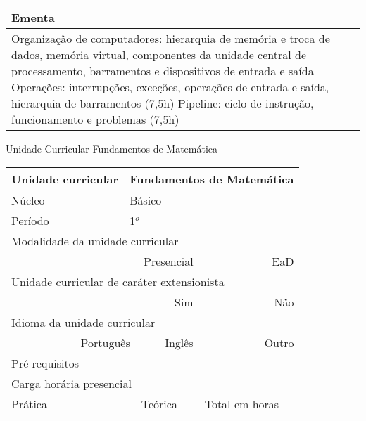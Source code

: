 \begin{quadro}[ht!]
\begin{tabular}{|p{3cm} p{2cm} p{3cm} p{2cm} p{3cm} p{2cm}|}
\multicolumn{6}{|p{15cm}|}{\cellcolor{blue1} Ementa} \\\hline
\hline\multicolumn{6}{|p{15cm}|}{\scriptsize Organização de computadores: hierarquia de memória e troca de dados, memória virtual, componentes da unidade central de processamento, barramentos e dispositivos de entrada e saída Operações: interrupções, exceções, operações de entrada e saída, hierarquia de barramentos (7,5h) Pipeline: ciclo de instrução, funcionamento e problemas (7,5h)}\\\hline
\hline
	\end{tabular}
\end{quadro}
\begin{quadro}[ht!]
  \centering\scriptsize
\caption{Unidade Curricular Fundamentos de Matemática}
\label{ unit_3 }
\begin{tabular}{|p{3cm} p{2cm} p{3cm} p{2cm} p{3cm} p{2cm}|}\hline
\multicolumn{1}{|p{3cm}|}{\cellcolor{blue1} Unidade curricular} & \multicolumn{5}{p{9cm}|}{ Fundamentos de Matemática }\\\hline
\multicolumn{1}{|p{3cm}|}{\cellcolor{blue1} Núcleo} & \multicolumn{5}{p{11.5cm}|}{ Básico }\\\hline
\multicolumn{1}{|p{3cm}|}{\cellcolor{blue1} Período} & \multicolumn{5}{p{9cm}|}{ 1$^o$ }\\\hline
\multicolumn{6}{|p{15cm}|}{\cellcolor{blue1} Modalidade da unidade curricular} \\\hline
\multicolumn{2}{|r}{		} &  \multicolumn{2}{r}{Presencial \XBox } & \multicolumn{2}{r|}{EaD \Square	} \\\hline
\multicolumn{6}{|p{15cm}|}{\cellcolor{blue1} Unidade curricular de caráter extensionista} \\\hline
\multicolumn{4}{|r}{			Sim \Square	} & \multicolumn{2}{r|}{	Não \XBox	}\\\hline
\multicolumn{6}{|p{15cm}|}{\cellcolor{blue1} Idioma da unidade curricular} \\ \hline
\multicolumn{2}{|r}{	Português \XBox	} &  \multicolumn{2}{r}{	Inglês \Square	} & \multicolumn{2}{r|}{	Outro \Square	} \\ \hline
\multicolumn{1}{|p{3cm}|}{\cellcolor{blue1} Pré-requisitos} & \multicolumn{5}{p{9cm}|}{ - }\\ \hline
\multicolumn{6}{|p{15cm}|}{\cellcolor{blue1} Carga horária presencial} \\ \hline
\multicolumn{1}{|p{3cm}|}{\raggedleft Prática} & \multicolumn{1}{p{1cm}|}{\centering	30	} &  \multicolumn{1}{p{3cm}|}{\raggedleft Teórica}  & \multicolumn{1}{p{1cm}|}{\centering 	30 } & \multicolumn{1}{p{3cm}|}{\raggedleft Total em horas} & \multicolumn{1}{p{1cm}|}{\raggedleft	60	} \\ \hline

\end{tabular}
\end{quadro}
